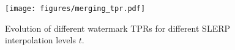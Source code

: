 \begin{figure}[t]
    \centering
    \texttt{[image: figures/merging\_tpr.pdf]}
    \caption{Evolution of different watermark TPRs for different \textsc{SLERP} interpolation levels $t$.}
    \label{fig:merging_tpr}
    \vspace{-0.2em}
\end{figure}
